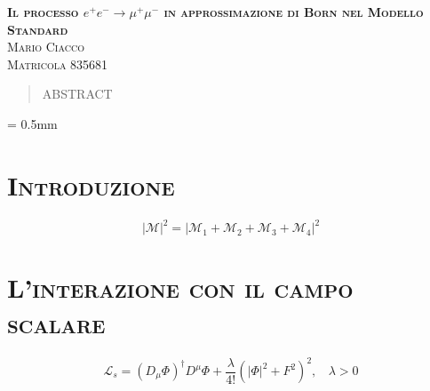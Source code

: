 \documentclass[11pt]{article}
\begin{document}
\renewcommand{\abstractname}{\vspace{-\baselineskip}}

    
    \begin{center} %
        \LARGE{\textbf{\textsc{Il processo $e^+ e^- \to \mu ^+ \mu ^-$ in approssimazione di Born nel Modello Standard}}}
        \bigskip\\\large{\textsc{Mario Ciacco}}
        \\\large{\textsc{Matricola 835681}}
    \end{center}
    \normalsize


    \begin{abstract}
    ABSTRACT
    \end{abstract}

    \unitlength = 0.5mm %
    

    \section{\centering\textsc{Introduzione} } %

    \begin{equation}
    \lvert\mathcal{M}\rvert^2=\lvert\mathcal{M}_1+\mathcal{M}_2+\mathcal{M}_3+\mathcal{M}_4\rvert^2
    \end{equation}


    \section{\centering\textsc{L'interazione con il campo scalare} }

    \begin{equation}
    \mathcal{L}_s=\left(D_\mu\Phi\right)^\dagger D^\mu\Phi+\frac{\lambda}{4!}\left(\lvert\Phi\rvert^2+F^2\right)^2, \ \ \ \ \lambda>0
    \end{equation}
\end{document}
